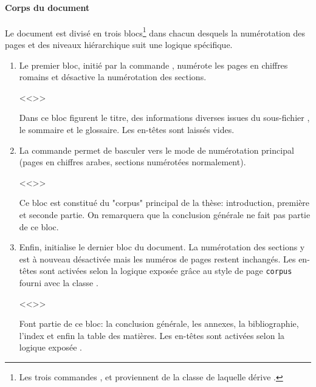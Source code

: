 \documentclass{ltxdockit}
\newcommand*{\classname}{droit-fr\xspace}
\begin{document}
\paragraph{Corps du document}

Le document est divisé en trois blocs\footnote{Les trois commandes ,  et  proviennent de la classe  de laquelle dérive \sty{\classname}.} dans chacun desquels la numérotation des pages et des niveaux hiérarchique suit une logique spécifique.
\begin{enumerate}
\item Le premier bloc, initié par la commande , numérote les pages en chiffres romains et désactive la numérotation des sections.
\begin{ltxexample}
<<\frontmatter>> %
\pagestyle{plain} %


\end{ltxexample}
Dans ce bloc figurent le titre, des informations diverses issues du sous-fichier , le sommaire et le glossaire. Les en-têtes sont laissés vides.

\item La commande  permet de basculer vers le mode de numérotation principal (pages en chiffres arabes, sections numérotées normalement).
\begin{ltxexample}
<<\mainmatter>> %
\pagestyle{corpus} %

\end{ltxexample}
Ce bloc est constitué du "corpus" principal de la thèse: introduction, première et seconde partie. On remarquera que la conclusion générale ne fait pas partie de ce bloc.

\item Enfin,  initialise le dernier bloc du document. La numérotation des sections y est à nouveau désactivée mais les numéros de pages restent inchangés. Les en-têtes sont activées selon la logique exposée  gr\^ace au style de page \texttt{corpus} fourni avec la classe \sty{\classname}.
\begin{ltxexample}
<<\backmatter>> %



\pagestyle{plain} %

\end{ltxexample}
Font partie de ce bloc: la conclusion générale, les annexes, la bibliographie, l'index et enfin la table des matières. Les en-têtes sont activées selon la logique exposée .
\end{enumerate}
\end{document}
